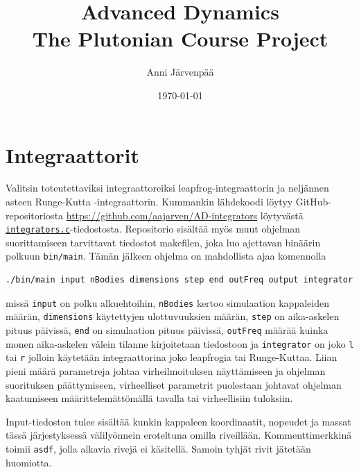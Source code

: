 \documentclass[12pt,a4paper,titlepage]{article}
\title{Advanced Dynamics \\ The Plutonian Course Project \vspace{0.5em}}
\author{Anni Järvenpää}
\date{\today}
\begin{document}
\maketitle




\section{Integraattorit}
Valitsin toteutettaviksi integraattoreiksi leapfrog-integraattorin ja neljännen asteen Runge-Kutta -integraattorin. Kummankin lähdekoodi löytyy GitHub-repositoriosta \url{https://github.com/aajarven/AD-integrators} löytyvästä \texttt{\href{https://github.com/aajarven/AD-integrators/blob/master/integrators.c}{integrators.c}}-tiedostosta. Repositorio sisältää myös muut ohjelman suorittamiseen tarvittavat tiedostot makefilen, joka luo ajettavan binäärin polkuun \texttt{bin/main}. Tämän jälkeen ohjelma on mahdollista ajaa komennolla
\begin{lstlisting}
./bin/main input nBodies dimensions step end outFreq output integrator
\end{lstlisting}
missä \texttt{input} on polku alkuehtoihin, \texttt{nBodies} kertoo simulaation kappaleiden määrän, \texttt{dimensions} käytettyjen ulottuvuuksien määrän, \texttt{step} on aika-askelen pituus päivissä, \texttt{end} on simulaation pituus päivissä, \texttt{outFreq} määrää kuinka monen aika-askelen välein tilanne kirjoitetaan tiedostoon ja \texttt{integrator} on joko \texttt{l} tai \texttt{r} jolloin käytetään integraattorina joko leapfrogia tai Runge-Kuttaa. Liian pieni määrä parametreja johtaa virheilmoituksen näyttämiseen ja ohjelman suorituksen päättymiseen, virheelliset parametrit puolestaan johtavat ohjelman kaatumiseen määrittelemättömällä tavalla tai virheellisiin tuloksiin.

Input-tiedoston tulee sisältää kunkin kappaleen koordinaatit, nopeudet ja massat tässä järjestyksessä välilyönnein eroteltuna omilla riveillään. Kommenttimerkkinä toimii \texttt{asdf}, jolla alkavia rivejä ei käsitellä. Samoin tyhjät rivit jätetään huomiotta.
\end{document}
